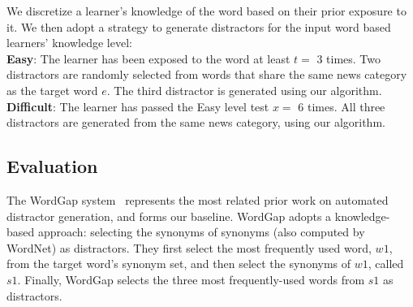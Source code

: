 
We discretize a learner's knowledge of the word based on their prior
exposure to it.  We then adopt a strategy to generate distractors for
the input word based learners' knowledge level: \\

{\bf Easy}: The learner has been exposed to the word at least $t=$ 3
times.  Two distractors are randomly selected from words that share
the same news category as the target word $e$. The third distractor is
generated using our algorithm. \\

{\bf Difficult}: The learner has passed the Easy level test $x=$ 6
times.  All three distractors are generated from the same news
category, using our algorithm.


\subsection{Evaluation}

The WordGap system~\cite{Knoop2013} represents the most related prior
work on automated distractor generation, and forms our
baseline. WordGap adopts a knowledge-based approach: selecting the
synonyms of synonyms (also computed by WordNet) as distractors.  They
first select the most frequently used word, $w1$, from the target
word's synonym set, and 
then select the synonyms of $w1$, called $s1$.  Finally, WordGap
selects the three most frequently-used words from $s1$ as
distractors.

